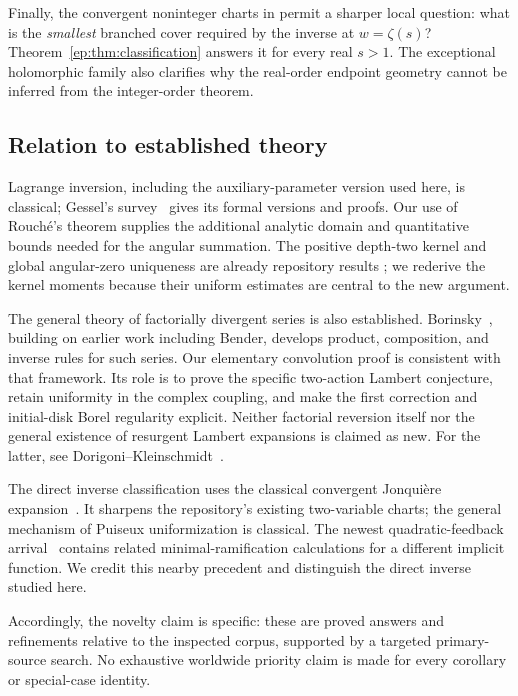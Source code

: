 \documentclass[11pt,a4paper]{article}
\theoremstyle{definition}
\theoremstyle{remark}
\numberwithin{equation}{section}
\begin{document}
Finally, the convergent noninteger charts in
\cite[\texttt{prop:noninteger}]{RepoInverse} permit a sharper local
question: what is the \emph{smallest} branched cover required by the
inverse at $w=\zeta(s)$? Theorem~\ref{ep:thm:classification} answers
it for every real $s>1$. The exceptional holomorphic family also
clarifies why the real-order endpoint geometry cannot be inferred
from the integer-order theorem.

\subsection{Relation to established theory}

Lagrange inversion, including the auxiliary-parameter version used
here, is classical; Gessel's survey~\cite{Gessel} gives its formal
versions and proofs. Our use of Rouch\'e's theorem supplies the
additional analytic domain and quantitative bounds needed for the
angular summation. The positive depth-two kernel and global
angular-zero uniqueness are already repository results
\cite{RepoThreshold}; we rederive the kernel moments because their
uniform estimates are central to the new argument.

The general theory of factorially divergent series is also established.
Borinsky~\cite{Borinsky}, building on earlier work including Bender,
develops product, composition, and inverse rules for such series.
Our elementary convolution proof is consistent with that framework.
Its role is to prove the specific two-action Lambert conjecture, retain
uniformity in the complex coupling, and make the first correction and
initial-disk Borel regularity explicit. Neither factorial reversion
itself nor the general existence of resurgent Lambert expansions is
claimed as new. For the latter, see Dorigoni--Kleinschmidt~\cite{DK}.

The direct inverse classification uses the classical convergent
Jonqui\`ere expansion~\cite{DLMF}. It sharpens the repository's
existing two-variable charts; the general mechanism of Puiseux
uniformization is classical. The newest quadratic-feedback
arrival~\cite{RepoQuadratic} contains related minimal-ramification
calculations for a different implicit function. We credit this
nearby precedent and distinguish the direct inverse studied here.

Accordingly, the novelty claim is specific: these are proved answers
and refinements relative to the inspected corpus, supported by a
targeted primary-source search. No exhaustive worldwide priority
claim is made for every corollary or special-case identity.
\end{document}
